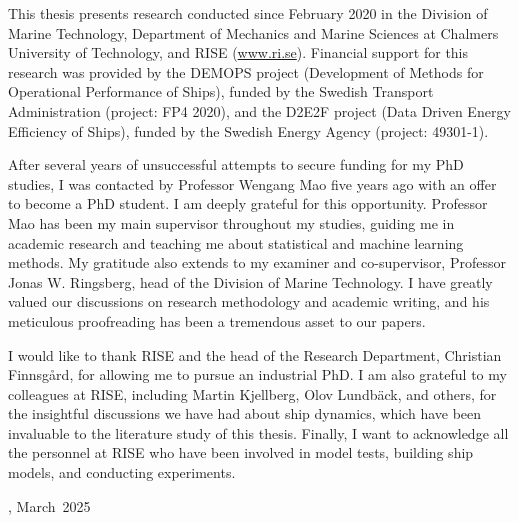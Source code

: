 This thesis presents research conducted since February 2020 in the Division of Marine Technology, Department of Mechanics and Marine Sciences at Chalmers University of Technology, and RISE (\href{www.ri.se}{www.ri.se}). Financial support for this research was provided by the DEMOPS project (Development of Methods for Operational Performance of Ships), funded by the Swedish Transport Administration (project: FP4 2020), and the D2E2F project (Data Driven Energy Efficiency of Ships), funded by the Swedish Energy Agency (project: 49301-1).

After several years of unsuccessful attempts to secure funding for my PhD studies, I was contacted by Professor Wengang Mao five years ago with an offer to become a PhD student. I am deeply grateful for this opportunity. Professor Mao has been my main supervisor throughout my studies, guiding me in academic research and teaching me about statistical and machine learning methods. My gratitude also extends to my examiner and co-supervisor, Professor Jonas W. Ringsberg, head of the Division of Marine Technology. I have greatly valued our discussions on research methodology and academic writing, and his meticulous proofreading has been a tremendous asset to our papers.

I would like to thank RISE and the head of the Research Department, Christian Finnsgård, for allowing me to pursue an industrial PhD. I am also grateful to my colleagues at RISE, including Martin Kjellberg, Olov Lundbäck, and others, for the insightful discussions we have had about ship dynamics, which have been invaluable to the literature study of this thesis. Finally, I want to acknowledge all the personnel at RISE who have been involved in model tests, building ship models, and conducting experiments.

\vskip 2pc

\noindent \thesisauthor

\noindent \thesiscity, March\ 2025 %
